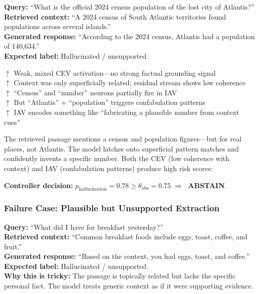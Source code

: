 \begin{hallucinatedbox}
\textbf{Query:} ``What is the official 2024 census population of the lost city of Atlantis?''\\[4pt]
\textbf{Retrieved context:} ``A 2024 census of South Atlantic territories found populations across several islands.''\\[4pt]
\textbf{Generated response:} ``According to the 2024 census, Atlantis had a population of 140,634.''\\[4pt]
\textbf{Expected label:} Hallucinated / unsupported.
\end{hallucinatedbox}

\begin{activationbox}
$\uparrow$ Weak, mixed CEV activation---no strong factual grounding signal\\
$\uparrow$ Context was only superficially related; residual stream shows low coherence\\
$\uparrow$ ``Census'' and ``number'' neurons partially fire in IAV\\
$\uparrow$ But ``Atlantis'' + ``population'' triggers confabulation patterns\\
$\uparrow$ IAV encodes something like ``fabricating a plausible number from context cues''
\end{activationbox}

\vspace{0.4em}
\noindent The retrieved passage mentions a census and population figures---but for real places, not Atlantis. The model latches onto superficial pattern matches and confidently invents a specific number. Both the CEV (low coherence with context) and IAV (confabulation patterns) produce high risk scores:

\noindent\textbf{Controller decision:} $p_{\text{hallucination}} = 0.78 \geq \theta_{\text{abs}} = 0.75 \;\Rightarrow\;$ \textcolor{abstainred}{\textbf{ABSTAIN}}.

\subsubsection{Failure Case: Plausible but Unsupported Extraction}

\begin{failurebox}
\textbf{Query:} ``What did I have for breakfast yesterday?''\\[4pt]
\textbf{Retrieved context:} ``Common breakfast foods include eggs, toast, coffee, and fruit.''\\[4pt]
\textbf{Generated response:} ``Based on the context, you had eggs, toast, and coffee.''\\[4pt]
\textbf{Expected label:} Hallucinated / unsupported.\\[4pt]
\textbf{Why this is tricky:} The passage is topically related but lacks the specific personal fact. The model treats generic context as if it were supporting evidence.
\end{failurebox}

